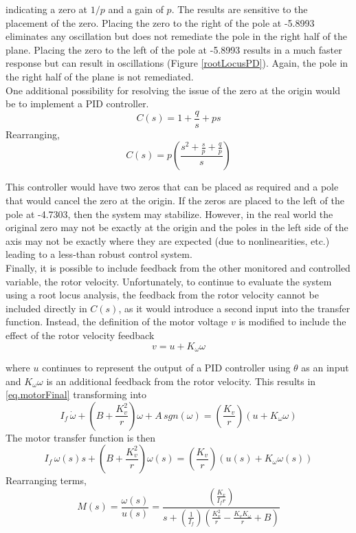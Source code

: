 \documentclass[12pt,letterpaper]{article}
\begin{document}
indicating a zero at $1/p$ and a gain of $p$.
The results are sensitive to the placement of the zero.  Placing the zero to the right of the pole at -5.8993 
eliminates any oscillation but does not remediate the pole in the right half of the plane.  Placing the zero to the left of the pole at -5.8993 results in a much faster response but can result in oscillations (Figure \ref{rootLocusPD}).  Again, the pole in the right half of the plane is not remediated. \\


One additional possibility for resolving the issue of the zero at the origin would be to implement a PID controller.
\begin{equation}
	C(s) = 1 + \frac{q}{s} + p s
\end{equation}
Rearranging,
\begin{equation}
	C(s) = p\left(\frac{s^2+\frac{s}{p}+\frac{q}{p}}{s}\right)
\end{equation}

This controller would have two zeros that can be placed as required and a pole that would cancel
the zero at the origin.  If the zeros are placed to the left of the pole at -4.7303, then the system may stabilize.
However, in the real world the original zero may not be exactly at the origin and the poles in the left side of the axis may not be exactly where they are expected (due to nonlinearities, etc.) 
leading to a less-than robust control system. \\

Finally, it is possible to include feedback from the other monitored and controlled variable, the rotor velocity.
Unfortunately, to continue to evaluate the system using a root locus analysis, the feedback from
the rotor velocity cannot be included directly in $C(s)$, as it would introduce a second input into the transfer function.  
Instead, the definition of the motor voltage $v$ is modified to include the effect of the rotor velocity feedback
\begin{equation}
    v = u + K_{\omega}\omega
\end{equation}

where $u$ continues to represent the output of a PID controller using $\theta$ as an input and $K_{\omega}\omega$ is an additional feedback
from the rotor velocity.
%
This results in \eqref{eq.motorFinal} transforming into
\begin{equation}
    I_{f} \, \dot{\omega} + \left( B+\frac{K_{v}^2}{r} \right) \omega +A \, sgn(\omega)= \left(\frac{K_{v}} {r}\right)(u + K_{\omega}\omega)
\end{equation}
The motor transfer function is then
\begin{equation}
    I_{f} \, \omega(s) s + \left( B+\frac{K_{v}^2}{r} \right) \omega(s) = \left(\frac{K_{v}} {r}\right)(u(s)+K_{\omega} \omega(s))
\end{equation}
Rearranging terms,
\begin{equation}
    M(s) = \frac{\omega(s)}{u(s)} =  \frac{\left(\frac{K_{v}} {I_{f}r}\right)}{s + (\frac{1}{I_{f}})(\frac{K_{v}^2}{r}-\frac{K_{v} K_{\omega}}{r}+B)}
    \label{rondoMucho}
\end{equation} 
\end{document}
